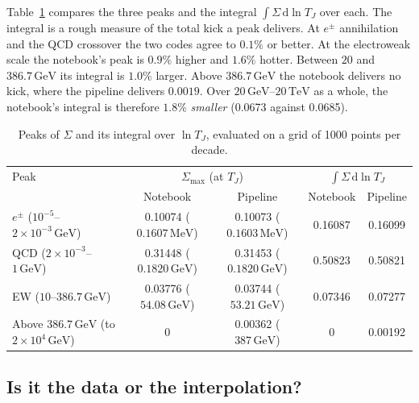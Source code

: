 \documentclass[11pt,a4paper]{article}
\newcommand{\TJ}{T_{J}}
\newcommand{\GeV}{\,\mathrm{GeV}}
\begin{document}
Table~\ref{tab:peaks} compares the three peaks and the integral $\int\Sigma\,\mathrm{d}\ln\TJ$
over each. The integral is a rough measure of the total kick a peak delivers. At $e^\pm$
annihilation and the QCD crossover the two codes agree to $0.1\%$ or better. At the
electroweak scale the notebook's peak is $0.9\%$ higher and $1.6\%$ hotter. Between $20$ and
$386.7\GeV$ its integral is $1.0\%$ larger. Above $386.7\GeV$ the notebook delivers no kick,
where the pipeline delivers $0.0019$. Over $20\GeV$--$20\,\mathrm{TeV}$ as a whole, the
notebook's integral is therefore $1.8\%$ \emph{smaller} (0.0673 against 0.0685).

\begin{table}[ht]
\centering\footnotesize
\begin{tabular}{@{}lcccc@{}}
\toprule
Peak & \multicolumn{2}{c}{$\Sigma_{\max}$ (at $\TJ$)} & \multicolumn{2}{c}{$\int\Sigma\,\mathrm{d}\ln\TJ$} \\
 & Notebook & Pipeline & Notebook & Pipeline \\
\midrule
$e^\pm$ ($10^{-5}$--$2\times10^{-3}\GeV$) & 0.10074 ($0.1607\,\mathrm{MeV}$) & 0.10073 ($0.1603\,\mathrm{MeV}$) & 0.16087 & 0.16099 \\
QCD ($2\times10^{-3}$--$1\GeV$) & 0.31448 ($0.1820\GeV$) & 0.31453 ($0.1820\GeV$) & 0.50823 & 0.50821 \\
EW ($10$--$386.7\GeV$) & 0.03776 ($54.08\GeV$) & 0.03744 ($53.21\GeV$) & 0.07346 & 0.07277 \\
Above $386.7\GeV$ (to $2\times10^4\GeV$) & 0 & 0.00362 ($387\GeV$) & 0 & 0.00192 \\
\bottomrule
\end{tabular}
\caption{Peaks of $\Sigma$ and its integral over $\ln\TJ$, evaluated on a grid of 1000 points
per decade.}
\label{tab:peaks}
\end{table}

\subsection{Is it the data or the interpolation?}
\label{sec:data-vs-scheme}
\end{document}
